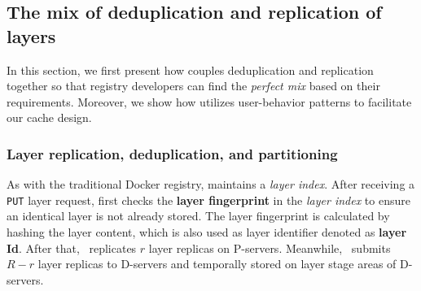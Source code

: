 \subsection{The mix of deduplication and replication of layers}
\label{sec:dedup-desgin}

%
%

In this section,
we first present how \sysname couples deduplication and replication together so
that registry developers can find the \emph{perfect mix} based on their requirements.
Moreover,
we show how \sysname utilizes user-behavior patterns to facilitate our cache design. 

\subsubsection{Layer replication, deduplication, and partitioning}

As with the traditional Docker registry, 
\sysname maintains a \emph{layer index}.
After receiving a \texttt{PUT} layer request,
\sysname first checks the \textbf{layer fingerprint} in the \emph{layer index} to ensure 
an identical layer is not already stored.
The layer fingerprint is calculated by hashing the layer content, 
which is also used as layer identifier denoted as \textbf{layer Id}.
After that, \sysname~replicates $r$ layer replicas on P-servers. 
Meanwhile, \sysname~submits $R-r$ layer replicas to 
D-servers and temporally stored on layer stage areas of D-servers.

 
